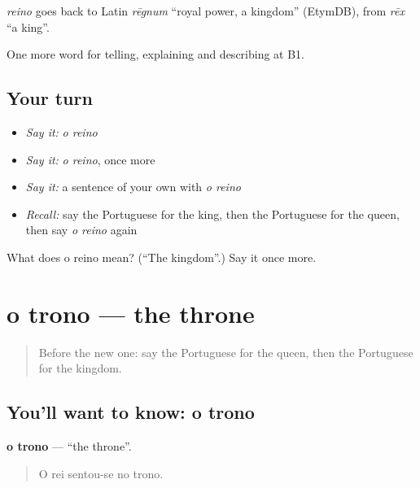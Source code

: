\begin{cousinweb}
\emph{reino} goes back to Latin \emph{rēgnum} \textquotedblleft{}royal power, a kingdom\textquotedblright{} (EtymDB), from \emph{rēx} \textquotedblleft{}a king\textquotedblright{}.
\end{cousinweb}

\begin{grammarlens}[title={What you've built}]
One more word for telling, explaining and describing at B1.
\end{grammarlens}

\subsection*{Your turn}
\begin{itemize}
\raggedright
  \item \emph{Say it:} \emph{o reino}
  \item \emph{Say it:} \emph{o reino}, once more
  \item \emph{Say it:} a sentence of your own with \emph{o reino}
  \item \emph{Recall:} say the Portuguese for the king, then the Portuguese for the queen, then say \emph{o reino} again
\end{itemize}

\begin{tcolorbox}[breakable,colback=teal!4,colframe=teal!35!black,title={Before you move on}]
What does o reino mean? (\textquotedblleft{}The kingdom\textquotedblright{}.) Say it once more.
\end{tcolorbox}
\section[o trono]{o trono — the throne}

\label{lesson:PT-C327-trono}



\begin{quote}
Before the new one: say the Portuguese for the queen, then the Portuguese for the kingdom.
\end{quote}

\subsection*{You'll want to know: o trono}
\textbf{o trono} — \textquotedblleft{}the throne\textquotedblright{}.

\begin{quote}
O rei sentou-se no trono.
\end{quote}

